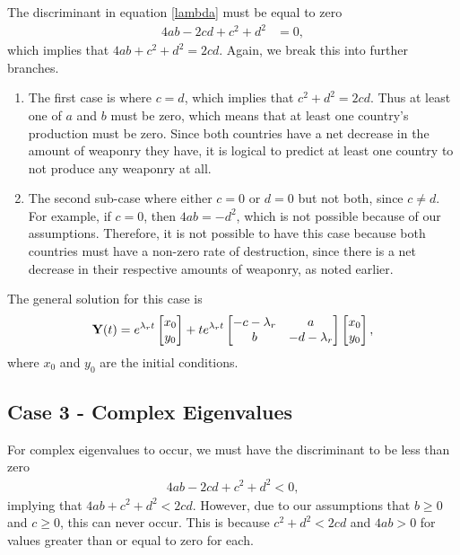 The discriminant in equation \eqref{lambda} must be equal to zero
	\begin{align} \label{disEqualToZero}
	4ab -2cd + c^2 + d^2 & = 0,
	\end{align}
which implies that $4ab + c^2 + d^2 = 2cd$. 
Again, we break this into further branches.
	\begin{enumerate}
 		\item The first case is where $c = d$, which implies that $c^2 + d^2 = 2cd$. Thus at least one of $a$ and $b$ must be zero, which means that at least one country's production must be zero. Since both countries have a net decrease in the amount of weaponry they have, it is logical to predict at least one country to not produce any weaponry at all.
		\item The second sub-case where either $c = 0$ or $d = 0$ but not both, since $c \ne d$. For example, if $c = 0$, then $4ab = -d^2$, which is not possible because of our assumptions. Therefore, it is not possible to have this case because both countries must have a non-zero rate of destruction, since there is a net decrease in their respective amounts of weaponry, as noted earlier.
	\end{enumerate}
The general solution for this case is 
	\begin{align}
	\bold{Y}(t) = e^{\lambda_r t}
	\left[ \begin{matrix}
	x_0 \\ y_0 
	\end{matrix}\right]
	+ te^{\lambda_r t}
	\left[\begin{matrix}
	-c - \lambda_r & a \\
	b & -d - \lambda_r 
	\end{matrix}\right]
	\left[ \begin{matrix}
	x_0 \\ y_0 
	\end{matrix}\right],
	\end{align}
where $x_0$ and $y_0$ are the initial conditions.	
	
\subsection{Case 3 - Complex Eigenvalues}

For complex eigenvalues to occur, we must have the discriminant to be less than zero
	\begin{align} \label{disLessThanZero}
	4ab -2cd + c^2 + d^2 < 0,
	\end{align}
implying that $4ab + c^2 + d^2 < 2cd$. However, due to our assumptions that $b \ge 0$ and $c \ge 0$, this can never occur. This is because $c^2 + d^2 < 2cd$ and $4ab > 0$ for values greater than or equal to zero for each.

